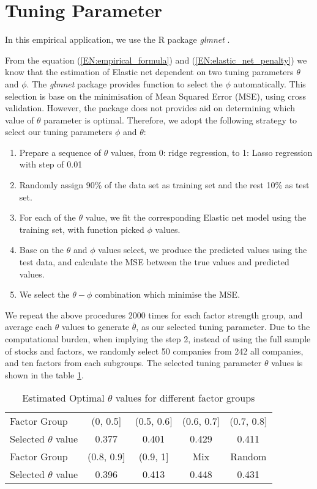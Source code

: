 \section{Tuning Parameter} \label{EN:parameter_tuning }
In this empirical application, we use the R package \textit{glmnet} \cite{Friedman2010, Simon2011}.

From the equation (\ref{EN:empirical_formula}) and (\ref{EN:elastic_net_penalty}) we know that the estimation of Elastic net dependent on two tuning parameters $\theta$ and $\phi$.
The \textit{glmnet} package provides function to select the $\phi$ automatically. 
This selection is base on the minimisation of Mean Squared Error (MSE), using cross validation.
However, the package does not provides aid on determining which value of $\theta$ parameter is optimal.
Therefore, we adopt the following strategy to select our tuning parameters $\phi$  and $\theta$:
\begin{enumerate}
\item Prepare a sequence of $\theta$ values, from 0: ridge regression, to 1: Lasso regression with step of 0.01
\item Randomly assign 90\% of the data set as training set and the rest 10\% as test set. 
\item For each of the $\theta$ value, we fit the corresponding Elastic net model using the training set, with function picked $\phi$ values.
\item Base on the $\theta$ and $\phi$ values select, we produce the predicted values using the test data, and calculate the MSE between the true values and predicted values.
\item We select the $\theta - \phi$ combination which minimise the MSE.
\end{enumerate}
We repeat the above procedures 2000 times for each factor strength group, and average each $\theta$ values to generate $\bar{\theta}$, as our selected tuning parameter.
Due to the computational burden, when implying the step 2, instead of using the full sample of stocks and factors, we randomly select 50 companies from 242 all companies, and ten factors from each subgroups.
The selected tuning parameter $\theta$ values is shown in the table \ref{table:optimal_theta}.
\begin{table}[]
	\centering
	\caption{Estimated Optimal $\theta$ values for different factor groups}
	\label{table:optimal_theta}
	\begin{tabular}{l|cccc}
		\hline
		\hline
		Factor Group            & (0, 0.5{]}   & (0.5, 0.6{]} & (0.6, 0.7{]} & (0.7, 0.8{]} \\ 
		Selected $\theta$ value & 0.377        & 0.401        & 0.429        & 0.411        \\ \hline
		Factor Group            & (0.8, 0.9{]} & (0.9, 1{]}   & Mix          & Random       \\ 
		Selected $\theta$ value & 0.396        & 0.413        & 0.448        & 0.431        \\ \hline
		\hline
	\end{tabular}
\end{table}
